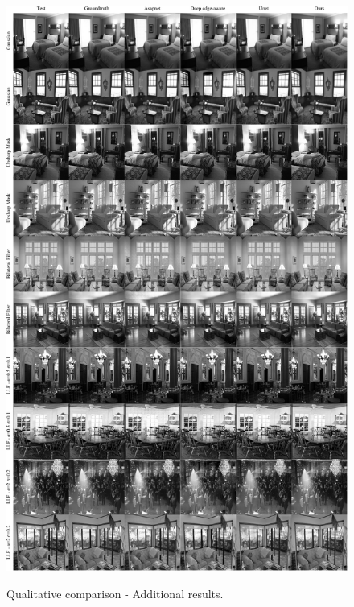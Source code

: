 \begin{figure}[ht]
  \centering

  {\includegraphics[width=0.8\linewidth]{Chapters/appendix-figs/room.pdf}}

   \caption{Qualitative comparison - Additional results.}
   \label{fig:appendix-DR-room}
\end{figure}


